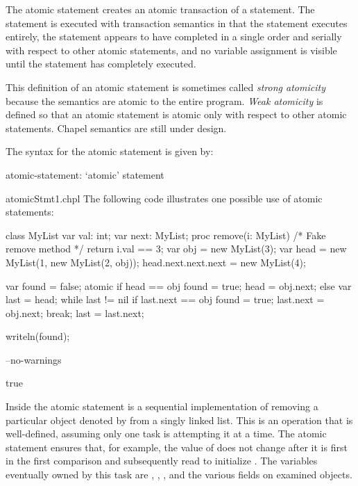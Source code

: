 The atomic statement creates an atomic transaction of a statement. The
statement is executed with transaction semantics in that the statement
executes entirely, the statement appears to have completed in a single
order and serially with respect to other atomic statements, and no
variable assignment is visible until the statement has completely
executed.

\begin{openissue}
This definition of an atomic statement is sometimes called {\em strong
atomicity} because the semantics are atomic to the entire program.
{\em Weak atomicity} is defined so that an atomic statement is atomic
only with respect to other atomic statements.  Chapel semantics are
still under design.
\end{openissue}

The syntax for the atomic statement is given by:
\begin{syntax}
atomic-statement:
  `atomic' statement
\end{syntax}

\begin{chapelexample}{atomicStmt1.chpl}
The following code illustrates one possible use of atomic statements:
\begin{chapelpre}
class MyList {
  var val: int;
  var next: MyList;
  proc remove(i: MyList) {
    /* Fake remove method */
    return i.val == 3;
  }
}
var obj = new MyList(3);
var head = new MyList(1, new MyList(2, obj));
head.next.next.next = new MyList(4);
\end{chapelpre}
\begin{chapel}
var found = false;
atomic {
  if head == obj {
    found = true;
    head = obj.next;
  } else {
    var last = head;
    while last != nil {
      if last.next == obj {
        found = true;
        last.next = obj.next;
        break;
      }
      last = last.next;
    }
  }
}
\end{chapel}
\begin{chapelpost}
writeln(found);
\end{chapelpost}
\begin{chapelcompopts}
--no-warnings
\end{chapelcompopts}
\begin{chapeloutput}
true
\end{chapeloutput}
Inside the atomic statement is a sequential implementation of removing
a particular object denoted by  from a singly linked list.
This is an operation that is well-defined, assuming only one task is
attempting it at a time. The atomic statement ensures that, for
example, the value of  does not change after it is first in
the first comparison and subsequently read to
initialize . The variables eventually owned by this task
are , , , and the various 
fields on examined objects.
\end{chapelexample}

